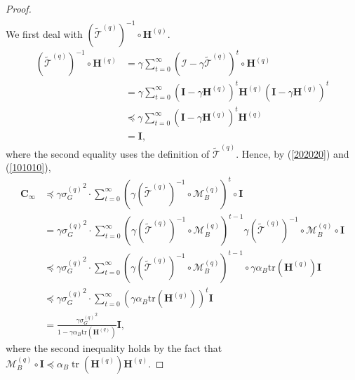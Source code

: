 \documentclass[11pt, letterpaper]{article}
\begin{document}
\begin{proof}
\begin{equation}
\begin{aligned}
        \end{aligned}
    \end{equation}
    We first deal with $(\widetilde{\mathcal{T}}^{(q)})^{-1}\circ\mathbf{H}^{(q)}$. 
    \begin{equation}
    \label{101010}
        \begin{aligned}
            (\widetilde{\mathcal{T}}^{(q)})^{-1}\circ\mathbf{H}^{(q)} & =\gamma\sum_{t=0}^\infty(\mathcal{I}-\gamma\widetilde{\mathcal{T}}^{(q)})^t\circ\mathbf{H}^{(q)} \\
            & =\gamma\sum_{t=0}^\infty(\mathbf{I}-\gamma\mathbf{H}^{(q)})^t\mathbf{H}^{(q)}(\mathbf{I}- \gamma\mathbf{H}^{(q)})^t \\
            & \preceq\gamma\sum_{t=0}^\infty(\mathbf{I}-\gamma\mathbf{H}^{(q)})^t\mathbf{H}^{(q)} \\
            &= \mathbf{I},
        \end{aligned}
    \end{equation}
    where the second equality uses the definition of $\widetilde{\mathcal{T}}^{(q)}$.
    Hence, by (\ref{202020}) and (\ref{101010}),
    \begin{equation}
        \label{eq: c26}
        \begin{aligned}
            \mathbf{C}_{\infty} & \preceq\gamma{\sigma_G^{(q)}}^2\cdot\sum_{t=0}^\infty(\gamma(\widetilde{\mathcal{T}}^{(q)})^{-1}\circ\mathcal{M}_B^{(q)})^t\circ\mathbf{I} \\
            &=\gamma{\sigma_G^{(q)}}^2\cdot\sum_{t=0}^\infty(\gamma(\widetilde{\mathcal{T}}^{(q)})^{-1}\circ\mathcal{M}_B^{(q)})^{t-1}\gamma(\widetilde{\mathcal{T}}^{(q)})^{-1}\circ\mathcal{M}_B^{(q)}\circ\mathbf{I} \\
            &\preceq\gamma{\sigma_G^{(q)}}^2\cdot\sum_{t=0}^\infty(\gamma(\widetilde{\mathcal{T}}^{(q)})^{-1}\circ\mathcal{M}_B^{(q)})^{t-1}\circ\gamma\alpha_B\mathrm{tr}(\mathbf{H}^{(q)})\mathbf{I} \\
            &\preceq\gamma{\sigma_G^{(q)}}^2\cdot\sum_{t=0}^\infty\left(\gamma\alpha_B\mathrm{tr}(\mathbf{H}^{(q)})\right)^{t}\mathbf{I} \\
            &= \frac{\gamma{\sigma_G^{(q)}}^2}{1-\gamma\alpha_B\mathrm{tr}(\mathbf{H}^{(q)})}\mathbf{I},
        \end{aligned}
    \end{equation}
    where the second inequality holds by the fact that $\mathcal{M}_B^{(q)}\circ\mathbf{I}\preceq\alpha_B\operatorname{tr}(\mathbf{H}^{(q)})\mathbf{H}^{(q)}$. 
    

\end{proof}
\end{document}
